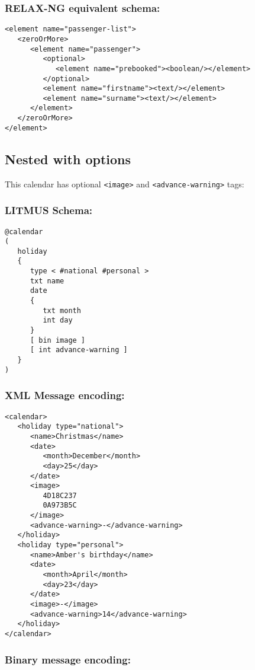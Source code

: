 \documentclass[12pt,a4paper,twoside]{article}
\renewcommand{\_}{\texttt{\symbol{95}}}
\begin{document}
\subsubsection*{RELAX-NG equivalent schema:}

\begin{verbatim}
<element name="passenger-list">
   <zeroOrMore>
      <element name="passenger">
         <optional>
            <element name="prebooked"><boolean/></element>
         </optional>
         <element name="firstname"><text/></element>
         <element name="surname"><text/></element>
      </element>
   </zeroOrMore>
</element>
\end{verbatim}

\subsection{Nested with options}

This calendar has optional \verb^<image>^ and \verb^<advance-warning>^ tags:

\subsubsection*{LITMUS Schema:}

\begin{verbatim}
@calendar
(
   holiday
   {
      type < #national #personal >
      txt name
      date
      {
         txt month
         int day
      }
      [ bin image ]
      [ int advance-warning ]
   }
)
\end{verbatim}

\subsubsection*{XML Message encoding:}

\begin{verbatim}
<calendar>
   <holiday type="national">
      <name>Christmas</name>
      <date>
         <month>December</month>
         <day>25</day>
      </date>
      <image>
         4D18C237
         0A973B5C
      </image>
      <advance-warning>-</advance-warning>
   </holiday>
   <holiday type="personal">
      <name>Amber's birthday</name>
      <date>
         <month>April</month>
         <day>23</day>
      </date>
      <image>-</image>
      <advance-warning>14</advance-warning>
   </holiday>
</calendar>
\end{verbatim}

\subsubsection*{Binary message encoding:}
\end{document}
